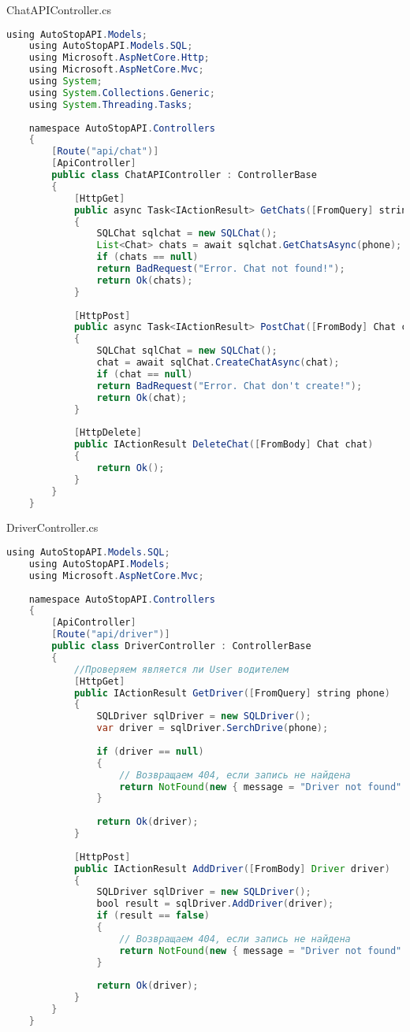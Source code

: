 ChatAPIController.cs
\begin{lstlisting}[language=Java]
	using AutoStopAPI.Models;
	using AutoStopAPI.Models.SQL;
	using Microsoft.AspNetCore.Http;
	using Microsoft.AspNetCore.Mvc;
	using System;
	using System.Collections.Generic;
	using System.Threading.Tasks;
	
	namespace AutoStopAPI.Controllers
	{
		[Route("api/chat")]
		[ApiController]
		public class ChatAPIController : ControllerBase
		{
			[HttpGet]
			public async Task<IActionResult> GetChats([FromQuery] string phone)
			{
				SQLChat sqlchat = new SQLChat();
				List<Chat> chats = await sqlchat.GetChatsAsync(phone);
				if (chats == null)
				return BadRequest("Error. Chat not found!");
				return Ok(chats);
			}
			
			[HttpPost]
			public async Task<IActionResult> PostChat([FromBody] Chat chat)
			{
				SQLChat sqlChat = new SQLChat();
				chat = await sqlChat.CreateChatAsync(chat);
				if (chat == null)
				return BadRequest("Error. Chat don't create!");
				return Ok(chat);
			}
			
			[HttpDelete]
			public IActionResult DeleteChat([FromBody] Chat chat)
			{
				return Ok();
			}
		}
	}
\end{lstlisting}

DriverController.cs
\begin{lstlisting}[language=Java]
	using AutoStopAPI.Models.SQL;
	using AutoStopAPI.Models;
	using Microsoft.AspNetCore.Mvc;
	
	namespace AutoStopAPI.Controllers
	{
		[ApiController]
		[Route("api/driver")]
		public class DriverController : ControllerBase
		{
			//Проверяем является ли User водителем
			[HttpGet]
			public IActionResult GetDriver([FromQuery] string phone)
			{
				SQLDriver sqlDriver = new SQLDriver();
				var driver = sqlDriver.SerchDrive(phone);
				
				if (driver == null)
				{
					// Возвращаем 404, если запись не найдена
					return NotFound(new { message = "Driver not found" });
				}
				
				return Ok(driver);
			}
			
			[HttpPost]
			public IActionResult AddDriver([FromBody] Driver driver)
			{
				SQLDriver sqlDriver = new SQLDriver();
				bool result = sqlDriver.AddDriver(driver);
				if (result == false)
				{
					// Возвращаем 404, если запись не найдена
					return NotFound(new { message = "Driver not found" });
				}
				
				return Ok(driver);
			}
		}
	}
\end{lstlisting}

